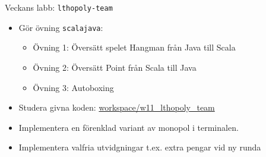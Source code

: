 

\ifkompendium\else

\begin{Slide}{Veckans labb: \texttt{lthopoly-team}}\SlideFontSmall
{}
\begin{itemize}
\item Gör övning \texttt{scalajava}:
\begin{itemize}\SlideFontSmall
\item Övning 1: Översätt spelet Hangman från Java till Scala
\item Övning 2: Översätt Point från Scala till Java
\item Övning 3: Autoboxing
\end{itemize}
\item Studera givna koden: {%
 \href{https://github.com/lunduniversity/introprog/tree/master/workspace/w11_lthopoly_team/src/main}{workspace/w11\_lthopoly\_team}}
\end{itemize}
\begin{itemize}
\item Implementera en förenklad variant av monopol i terminalen.
\end{itemize}
\begin{itemize}
\item Implementera valfria utvidgningar t.ex. extra pengar vid ny runda
\end{itemize}
\end{Slide}


\fi











